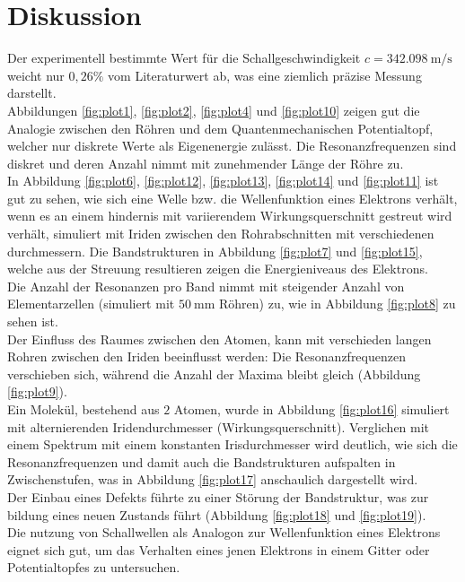 \section{Diskussion}
Der experimentell bestimmte Wert für die Schallgeschwindigkeit
$c=\SI{342.098}{\meter\per\second}$ weicht nur $0,26\%$ vom Literaturwert ab,
was eine ziemlich präzise Messung darstellt.\\
Abbildungen \ref{fig:plot1}, \ref{fig:plot2}, \ref{fig:plot4} und \ref{fig:plot10} zeigen gut die Analogie
zwischen den Röhren und dem Quantenmechanischen Potentialtopf, welcher
nur diskrete Werte als Eigenenergie zulässt. Die Resonanzfrequenzen sind
diskret und deren Anzahl nimmt mit zunehmender Länge der Röhre zu.\\
In Abbildung \ref{fig:plot6}, \ref{fig:plot12}, \ref{fig:plot13}, \ref{fig:plot14} und \ref{fig:plot11} ist gut zu sehen, wie sich eine Welle bzw. die Wellenfunktion
eines Elektrons verhält, wenn es an einem hindernis mit variierendem Wirkungsquerschnitt
gestreut wird verhält, simuliert mit Iriden zwischen den Rohrabschnitten mit verschiedenen
durchmessern. Die Bandstrukturen in Abbildung \ref{fig:plot7} und \ref{fig:plot15}, welche aus der Streuung
resultieren zeigen die Energieniveaus des Elektrons.\\
Die Anzahl der Resonanzen pro Band nimmt mit steigender Anzahl von Elementarzellen
(simuliert mit $\SI{50}{\milli\meter}$ Röhren) zu, wie in Abbildung \ref{fig:plot8} zu sehen ist.\\
Der Einfluss des Raumes zwischen den Atomen, kann mit verschieden langen Rohren zwischen den
Iriden beeinflusst werden: Die Resonanzfrequenzen verschieben sich, während die
Anzahl der Maxima bleibt gleich (Abbildung \ref{fig:plot9}).\\
Ein Molekül, bestehend aus $2$ Atomen, wurde in Abbildung \ref{fig:plot16} simuliert mit alternierenden Iridendurchmesser (Wirkungsquerschnitt).
Verglichen mit einem Spektrum mit einem konstanten Irisdurchmesser wird deutlich, wie sich die Resonanzfrequenzen und damit
auch die Bandstrukturen aufspalten in Zwischenstufen, was in Abbildung \ref{fig:plot17} anschaulich dargestellt wird.\\
Der Einbau eines Defekts führte zu einer Störung der Bandstruktur, was zur bildung
eines neuen Zustands führt (Abbildung \ref{fig:plot18} und \ref{fig:plot19}).\\
Die nutzung von Schallwellen als Analogon zur Wellenfunktion eines Elektrons eignet sich gut,
um das Verhalten eines jenen Elektrons in einem Gitter oder Potentialtopfes zu untersuchen.
